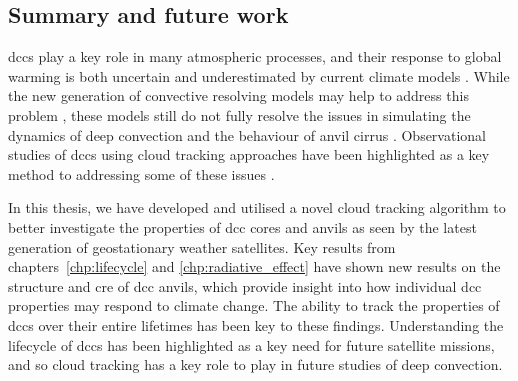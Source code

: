 \subsection{Summary and future work}


\acrshort{dcc}s play a key role in many atmospheric processes, and their response to global warming is both uncertain \citep{sherwood_assessment_2020} and underestimated by current climate models \citep{hill_climate_2023}.
While the new generation of convective resolving models may help to address this problem \citep{stevens_added_2020}, these models still do not fully resolve the issues in simulating the dynamics of deep convection \citep{jeevanjee_vertical_2017} and the behaviour of anvil cirrus \citep{sullivan_ice_2021}.
Observational studies of \acrshort{dcc}s using cloud tracking approaches have been highlighted as a key method to addressing some of these issues \citep{gasparini_opinion_2023}.

In this thesis, we have developed and utilised a novel cloud tracking algorithm to better investigate the properties of \acrshort{dcc} cores and anvils as seen by the latest generation of geostationary weather satellites.
Key results from chapters~\ref{chp:lifecycle} and \ref{chp:radiative_effect} have shown new results on the structure and \acrshort{cre} of \acrshort{dcc} anvils, which provide insight into how individual \acrshort{dcc} properties may respond to climate change.
The ability to track the properties of \acrshort{dcc}s over their entire lifetimes has been key to these findings.
Understanding the lifecycle of \acrshort{dcc}s has been highlighted as a key need for future satellite missions, and so cloud tracking has a key role to play in future studies of deep convection.